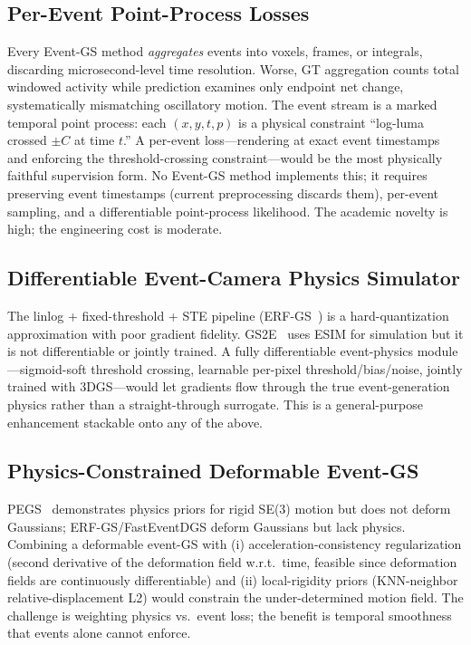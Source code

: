 \subsection{Per-Event Point-Process Losses}
\label{sec:disc:pointprocess}

Every Event-GS method \emph{aggregates} events into voxels, frames, or integrals, discarding microsecond-level time resolution. Worse, GT aggregation counts total windowed activity while prediction examines only endpoint net change, systematically mismatching oscillatory motion. The event stream is a marked temporal point process: each $(x,y,t,p)$ is a physical constraint ``log-luma crossed $\pm C$ at time $t$.'' A per-event loss---rendering at exact event timestamps and enforcing the threshold-crossing constraint---would be the most physically faithful supervision form. No Event-GS method implements this; it requires preserving event timestamps (current preprocessing discards them), per-event sampling, and a differentiable point-process likelihood. The academic novelty is high; the engineering cost is moderate.

\subsection{Differentiable Event-Camera Physics Simulator}
\label{sec:disc:sim}

The linlog + fixed-threshold + STE pipeline (ERF-GS~\cite{bai2026erfgs}) is a hard-quantization approximation with poor gradient fidelity. GS2E~\cite{li2025gs2e} uses ESIM for simulation but it is not differentiable or jointly trained. A fully differentiable event-physics module---sigmoid-soft threshold crossing, learnable per-pixel threshold/bias/noise, jointly trained with 3DGS---would let gradients flow through the true event-generation physics rather than a straight-through surrogate. This is a general-purpose enhancement stackable onto any of the above.

\subsection{Physics-Constrained Deformable Event-GS}
\label{sec:disc:physics}

PEGS~\cite{xu2025pegs} demonstrates physics priors for rigid SE(3) motion but does not deform Gaussians; ERF-GS/FastEventDGS deform Gaussians but lack physics. Combining a deformable event-GS with (i) acceleration-consistency regularization (second derivative of the deformation field w.r.t.\ time, feasible since deformation fields are continuously differentiable) and (ii) local-rigidity priors (KNN-neighbor relative-displacement L2) would constrain the under-determined motion field. The challenge is weighting physics vs.\ event loss; the benefit is temporal smoothness that events alone cannot enforce.

